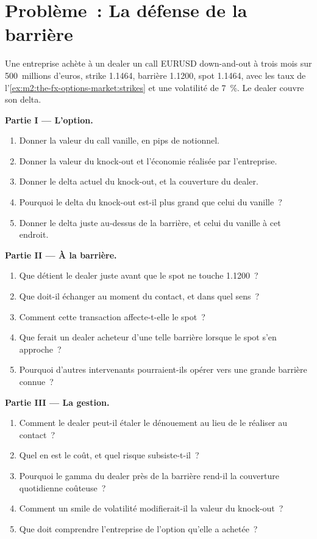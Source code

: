 \section{Problème~: La défense de la barrière}

\begin{problem}\label{pb:m2:the-fx-options-market:1}
Une entreprise achète à un dealer un call EURUSD down-and-out à trois mois sur
500~millions d'euros, strike 1.1464, barrière 1.1200, spot 1.1464, avec les taux de
l'\cref{ex:m2:the-fx-options-market:strikes} et une volatilité de 7~\%. Le dealer
couvre son delta.

\medskip\noindent\textbf{Partie I --- L'option.}
\begin{enumerate}
\item Donner la valeur du call vanille, en pips de notionnel.
\item Donner la valeur du knock-out et l'économie réalisée par l'entreprise.
\item Donner le delta actuel du knock-out, et la couverture du dealer.
\item Pourquoi le delta du knock-out est-il plus grand que celui du vanille~?
\item Donner le delta juste au-dessus de la barrière, et celui du vanille à cet endroit.
\end{enumerate}

\medskip\noindent\textbf{Partie II --- À la barrière.}
\begin{enumerate}[resume]
\item Que détient le dealer juste avant que le spot ne touche 1.1200~?
\item Que doit-il échanger au moment du contact, et dans quel sens~?
\item Comment cette transaction affecte-t-elle le spot~?
\item Que ferait un dealer acheteur d'une telle barrière lorsque le spot s'en approche~?
\item Pourquoi d'autres intervenants pourraient-ils opérer vers une grande barrière connue~?
\end{enumerate}

\medskip\noindent\textbf{Partie III --- La gestion.}
\begin{enumerate}[resume]
\item Comment le dealer peut-il étaler le dénouement au lieu de le réaliser au contact~?
\item Quel en est le coût, et quel risque subsiste-t-il~?
\item Pourquoi le gamma du dealer près de la barrière rend-il la couverture quotidienne coûteuse~?
\item Comment un smile de volatilité modifierait-il la valeur du knock-out~?
\item Que doit comprendre l'entreprise de l'option qu'elle a achetée~?
\end{enumerate}


\end{problem}

